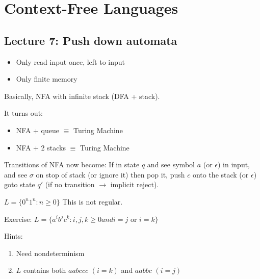 \chapter{Context-Free Languages}

\section*{Lecture 7: Push down automata}

\begin{itemize}
    \item Only read input once, left to input
    \item Only finite memory
\end{itemize}

Basically, NFA with infinite stack (DFA + stack).

It turns out:
\begin{itemize}
    \item NFA + queue $\equiv$ Turing Machine
    \item NFA + 2 stacks $\equiv$ Turing Machine
\end{itemize}

Transitions of NFA now become: If in state $q$ and see symbol $a$ (or $\epsilon$) in input, and see $\sigma$ on stop of stack (or ignore it) then pop it, push $c$ onto the stack (or $\epsilon$) goto state $q'$ (if no transition $\rightarrow$ implicit reject).

\begin{example}[2.14 in text]
    $L = \{0^n1^n: n \geq 0\}$ This is not regular.
\end{example}

Exercise: $L = \{a^i b^j c^k: i, j, k \geq 0 and i = j \text{ or } i = k\}$

Hints:

\begin{enumerate}
  \item Need nondeterminism
  \item $L$ contains both $aabccc$ $(i = k)$ and $aabbc$ $(i = j)$
\end{enumerate}
